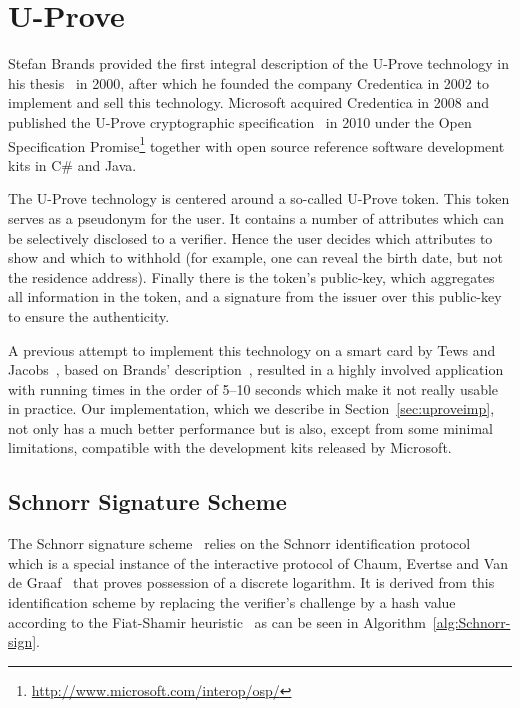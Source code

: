 \chapter{U-Prove}

Stefan Brands provided the first integral description of the U-Prove technology
in his thesis~\cite{Brands2000} in 2000, after which he founded the company
Credentica in 2002 to implement and sell this technology. Microsoft acquired
Credentica in 2008 and published the U-Prove cryptographic
specification~\cite{U-Prove_Crypto2010, U-Prove_Crypto2013} in 2010 under the
Open Specification Promise\footnote{\url{http://www.microsoft.com/interop/osp/}}
together with open source reference software development kits in C\# and Java.

The U-Prove technology is centered around a so-called U-Prove token. This token
serves as a pseudonym for the user. It contains a number of attributes which can
be selectively disclosed to a verifier. Hence the user decides which attributes
to show and which to withhold (for example, one can reveal the birth date, but
not the residence address). Finally there is the token's public-key, which
aggregates all information in the token, and a signature from the issuer over
this public-key to ensure the authenticity.

A previous attempt to implement this technology on a smart card by Tews and
Jacobs~\cite{TewsJacobs09}, based on Brands' description~\cite{Brands2000},
resulted in a highly involved application with running times in the order of
5--10 seconds which make it not really usable in practice. Our implementation,
which we describe in Section~\ref{sec:uproveimp}, not only has a much better
performance but is also, except from some minimal limitations, compatible with
the development kits released by Microsoft.

\section{Schnorr Signature Scheme}

The Schnorr signature scheme~\cite{Schnorr1989,Schnorr1991} relies on the
Schnorr identification protocol~\cite{Schnorr1989} which is a special instance
of the interactive protocol of Chaum, Evertse and Van de
Graaf~\cite{ChaumEvdG1988} that proves possession of a discrete logarithm. It
is derived from this identification scheme by replacing the verifier's challenge
by a hash value according to the Fiat-Shamir heuristic~\cite{FiatShamir1987} as
can be seen in Algorithm~\ref{alg:Schnorr-sign}.

